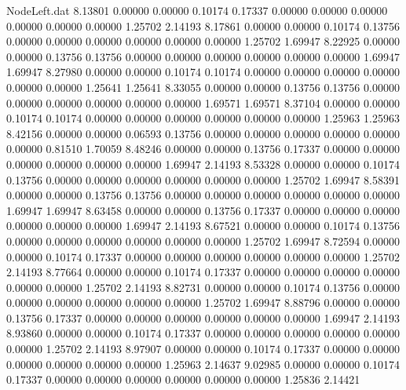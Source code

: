 \begin{filecontents}{NodeLeft.dat}
   8.13801    0.00000    0.00000     0.10174    0.17337    0.00000    0.00000    0.00000    0.00000    0.00000    0.00000    1.25702    2.14193
   8.17861    0.00000    0.00000     0.10174    0.13756    0.00000    0.00000    0.00000    0.00000    0.00000    0.00000    1.25702    1.69947
   8.22925    0.00000    0.00000     0.13756    0.13756    0.00000    0.00000    0.00000    0.00000    0.00000    0.00000    1.69947    1.69947
   8.27980    0.00000    0.00000     0.10174    0.10174    0.00000    0.00000    0.00000    0.00000    0.00000    0.00000    1.25641    1.25641
   8.33055    0.00000    0.00000     0.13756    0.13756    0.00000    0.00000    0.00000    0.00000    0.00000    0.00000    1.69571    1.69571
   8.37104    0.00000    0.00000     0.10174    0.10174    0.00000    0.00000    0.00000    0.00000    0.00000    0.00000    1.25963    1.25963
   8.42156    0.00000    0.00000     0.06593    0.13756    0.00000    0.00000    0.00000    0.00000    0.00000    0.00000    0.81510    1.70059
   8.48246    0.00000    0.00000     0.13756    0.17337    0.00000    0.00000    0.00000    0.00000    0.00000    0.00000    1.69947    2.14193
   8.53328    0.00000    0.00000     0.10174    0.13756    0.00000    0.00000    0.00000    0.00000    0.00000    0.00000    1.25702    1.69947
   8.58391    0.00000    0.00000     0.13756    0.13756    0.00000    0.00000    0.00000    0.00000    0.00000    0.00000    1.69947    1.69947
   8.63458    0.00000    0.00000     0.13756    0.17337    0.00000    0.00000    0.00000    0.00000    0.00000    0.00000    1.69947    2.14193
   8.67521    0.00000    0.00000     0.10174    0.13756    0.00000    0.00000    0.00000    0.00000    0.00000    0.00000    1.25702    1.69947
   8.72594    0.00000    0.00000     0.10174    0.17337    0.00000    0.00000    0.00000    0.00000    0.00000    0.00000    1.25702    2.14193
   8.77664    0.00000    0.00000     0.10174    0.17337    0.00000    0.00000    0.00000    0.00000    0.00000    0.00000    1.25702    2.14193
   8.82731    0.00000    0.00000     0.10174    0.13756    0.00000    0.00000    0.00000    0.00000    0.00000    0.00000    1.25702    1.69947
   8.88796    0.00000    0.00000     0.13756    0.17337    0.00000    0.00000    0.00000    0.00000    0.00000    0.00000    1.69947    2.14193
   8.93860    0.00000    0.00000     0.10174    0.17337    0.00000    0.00000    0.00000    0.00000    0.00000    0.00000    1.25702    2.14193
   8.97907    0.00000    0.00000     0.10174    0.17337    0.00000    0.00000    0.00000    0.00000    0.00000    0.00000    1.25963    2.14637
   9.02985    0.00000    0.00000     0.10174    0.17337    0.00000    0.00000    0.00000    0.00000    0.00000    0.00000    1.25836    2.14421

\end{filecontents}
